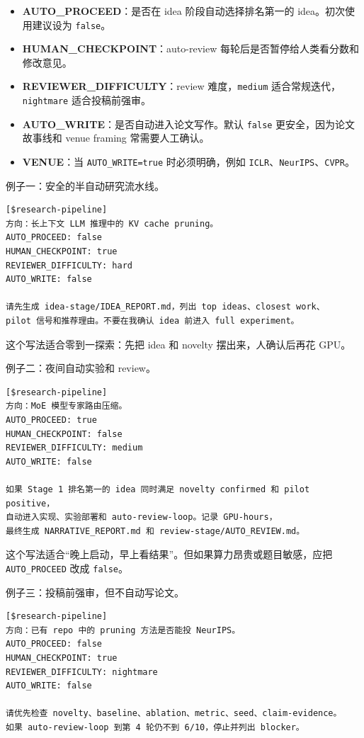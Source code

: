 \documentclass[UTF8,a4paper,11pt,fontset=none]{ctexart}
\newcommand{\skill}[1]{\texttt{#1}}
\newcommand{\keypoint}[1]{\textbf{#1}}
\begin{document}
\begin{itemize}
  \item \keypoint{AUTO\_PROCEED}：是否在 idea 阶段自动选择排名第一的 idea。初次使用建议设为 \skill{false}。
  \item \keypoint{HUMAN\_CHECKPOINT}：auto-review 每轮后是否暂停给人类看分数和修改意见。
  \item \keypoint{REVIEWER\_DIFFICULTY}：review 难度，\skill{medium} 适合常规迭代，\skill{nightmare} 适合投稿前强审。
  \item \keypoint{AUTO\_WRITE}：是否自动进入论文写作。默认 \skill{false} 更安全，因为论文故事线和 venue framing 常需要人工确认。
  \item \keypoint{VENUE}：当 \skill{AUTO\_WRITE=true} 时必须明确，例如 \skill{ICLR}、\skill{NeurIPS}、\skill{CVPR}。
\end{itemize}

例子一：安全的半自动研究流水线。

\begin{lstlisting}
[$research-pipeline]
方向：长上下文 LLM 推理中的 KV cache pruning。
AUTO_PROCEED: false
HUMAN_CHECKPOINT: true
REVIEWER_DIFFICULTY: hard
AUTO_WRITE: false

请先生成 idea-stage/IDEA_REPORT.md，列出 top ideas、closest work、
pilot 信号和推荐理由。不要在我确认 idea 前进入 full experiment。
\end{lstlisting}

这个写法适合零到一探索：先把 idea 和 novelty 摆出来，人确认后再花 GPU。

例子二：夜间自动实验和 review。

\begin{lstlisting}
[$research-pipeline]
方向：MoE 模型专家路由压缩。
AUTO_PROCEED: true
HUMAN_CHECKPOINT: false
REVIEWER_DIFFICULTY: medium
AUTO_WRITE: false

如果 Stage 1 排名第一的 idea 同时满足 novelty confirmed 和 pilot positive，
自动进入实现、实验部署和 auto-review-loop。记录 GPU-hours，
最终生成 NARRATIVE_REPORT.md 和 review-stage/AUTO_REVIEW.md。
\end{lstlisting}

这个写法适合“晚上启动，早上看结果”。但如果算力昂贵或题目敏感，应把 \skill{AUTO\_PROCEED} 改成 \skill{false}。

例子三：投稿前强审，但不自动写论文。

\begin{lstlisting}
[$research-pipeline]
方向：已有 repo 中的 pruning 方法是否能投 NeurIPS。
AUTO_PROCEED: false
HUMAN_CHECKPOINT: true
REVIEWER_DIFFICULTY: nightmare
AUTO_WRITE: false

请优先检查 novelty、baseline、ablation、metric、seed、claim-evidence。
如果 auto-review-loop 到第 4 轮仍不到 6/10，停止并列出 blocker。
\end{lstlisting}
\end{document}
